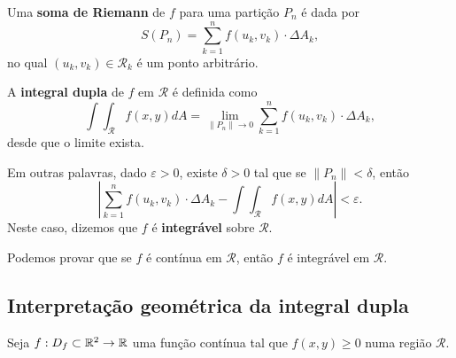 \begin{definition}
    Uma \textbf{soma de Riemann} de \(f\) para uma partição \(P_n\) é dada por \[S(P_n) = \sum_{k=1}^{n} f(u_k,v_k)\cdot \Delta A_k,\] no qual \((u_k,v_k)\in\mathcal{R}_k\) é um ponto arbitrário.
\end{definition}

\begin{definition}
    A \textbf{integral dupla} de \(f\) em \(\mathcal{R}\) é definida como \[\int\int_\mathcal{R} f(x,y) dA = \lim_{\|P_n\| \to 0} \sum_{k=1}^{n} f(u_k,v_k)\cdot\Delta A_k,\] desde que o limite exista.
\end{definition}

Em outras palavras, dado \(\varepsilon > 0\), existe \(\delta>0\) tal que se \(\|P_n\| < \delta\), então \[\left| \sum_{k=1}^{n} f(u_k,v_k)\cdot\Delta A_k - \int\int_\mathcal{R} f(x,y) dA\right| < \varepsilon.\] Neste caso, dizemos que \(f\) é \textbf{integrável} sobre \(\mathcal{R}\).

\begin{remark}
    Podemos provar que se \(f\) é contínua em \(\mathcal{R}\), então \(f\) é integrável em \(\mathcal{R}\).
\end{remark}

\subsection{Interpretação geométrica da integral dupla}

Seja \(f: D_f\subset\mathbb{R}^2 \to \mathbb{R}\) uma função contínua tal que \(f(x,y)\geq 0\) numa região \(\mathcal{R}\).

